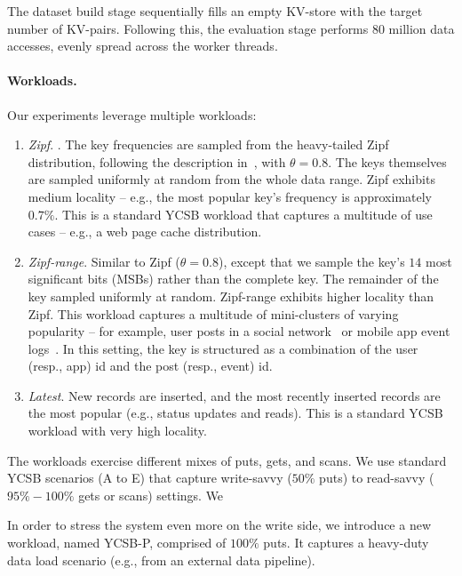 The dataset build stage sequentially fills an empty KV-store with the target number of KV-pairs. Following this, 
the evaluation stage performs 80 million data accesses, evenly spread across the worker threads.   

\paragraph{Workloads.} 

Our experiments leverage multiple workloads: 

\begin{enumerate}
\item {\em Zipf}. . The key frequencies are sampled from the heavy-tailed Zipf distribution, 
following the description in~\cite{?}, with $\theta = 0.8$. The keys themselves are sampled 
uniformly at random from the whole data range. Zipf exhibits medium locality -- e.g., the most 
popular key's frequency is approximately $0.7\%$. This is a standard YCSB workload that captures
a multitude of use cases -- e.g., a web page cache distribution. 

\item {\em Zipf-range}. Similar to Zipf ($\theta=0.8$), except that we sample the key's $14$ most significant bits
(MSBs) rather than the complete key. The remainder of the key sampled uniformly at random. Zipf-range exhibits
higher locality than Zipf. This workload captures a multitude of mini-clusters of varying popularity -- 
for example, user posts in a social network~\cite{linkbench} or mobile app event logs~\cite{flurry}. 
In this setting, the key is structured as a combination of the user (resp., app) id and the post (resp., event) id. 

\item {\em Latest}. New records are inserted, and the most recently inserted records are the 
most popular (e.g., status updates and reads). This is a standard YCSB workload with very high 
locality. 
\end{enumerate}

The workloads exercise different mixes of puts, gets, and scans. We use standard YCSB scenarios 
(A to E) that capture write-savvy ($50\%$ puts) to read-savvy ($95\%-100\%$ gets or scans) settings. 
We 

In order to stress the system even more on the write side, we introduce a new workload, named 
YCSB-P, comprised of $100\%$ puts. It captures a heavy-duty data load scenario (e.g., from an 
external data pipeline). 

